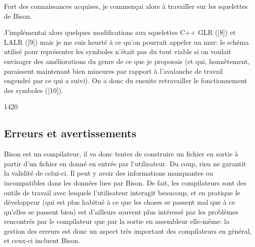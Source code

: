 \documentclass[a4paper,11pt,twoside,final]{article}
\begin{document}
  Fort des connaissances acquises, je commençai alors à travailler sur les
  squelettes de Bison.

  J'implémentai alors quelques modifications aux squelettes C++ GLR ([8]) et
  LALR ([9]) mais je me suis heurté à ce qu'on pourrait appeler un mur: le
  schéma utilisé pour représenter les symboles n'était pas du tout viable si on
  voulait envisager des améliorations du genre de ce que je proposais (et qui,
  honnêtement, paraissent maintenant bien mineures par rapport à l'avalanche de
  travail engendré par ce qui a suivi). On a donc du ensuite retravailler le
  fonctionnement des symboles ([10]).

  \begin{adjustwidth}{-4cm}{-2cm}
  \begin{gantt}[xunitlength=0.7cm,fontsize=\small,titlefontsize=\small,drawledgerline=true]{14}{20}
    \begin{ganttitle}
    \end{ganttitle}
    \begin{ganttitle}
    \end{ganttitle}
    \begin{ganttitle}
    \end{ganttitle}
  \end{gantt}
  \end{adjustwidth}

  \cleardoublepage

  \subsection{Erreurs et avertissements}

  Bison est un compilateur, il va donc tenter de construire un fichier en
  sortie à partir d'un fichier en donné en entrée par l'utilisateur. Du coup,
  rien ne garantit la validité de celui-ci. Il peut y avoir des informations
  manquantes ou incompatibles dans les données lues par Bison. De fait, les
  compilateurs sont des outils de travail avec lesquels l'utilisateur interagit
  beaucoup, et en pratique le développeur (qui est plus habitué à ce que les
  choses se passent mal que à ce qu'elles se passent bien) est d'ailleurs
  souvent plus intéressé par les problèmes rencontrés par le compilateur que
  par la sortie en assembleur elle-même: la gestion des erreurs est donc un
  aspect très important des compilateurs en général, et ceux-ci incluent Bison.
\end{document}
